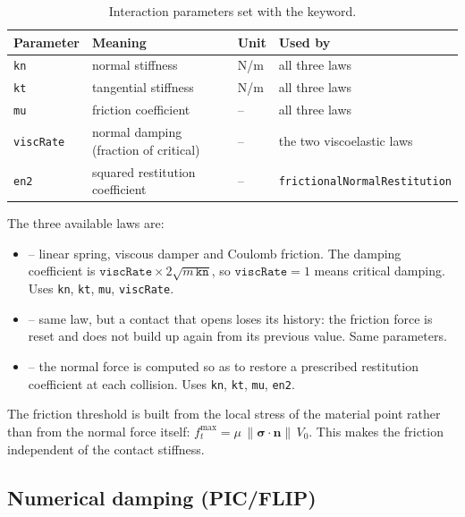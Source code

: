 \documentclass[a4paper,onecolumn,11pt]{doofus}
\begin{document}
\begin{table}[H]
\centering
\begin{tabular}{llll}
\toprule
\textbf{Parameter} & \textbf{Meaning} & \textbf{Unit} & \textbf{Used by}\\
\midrule
\texttt{kn}       & normal stiffness            & N/m & all three laws \\
\texttt{kt}       & tangential stiffness        & N/m & all three laws \\
\texttt{mu}       & friction coefficient        & --  & all three laws \\
\texttt{viscRate} & normal damping (fraction of critical) & -- & the two viscoelastic laws \\
\texttt{en2}      & squared restitution coefficient & -- & \texttt{frictionalNormalRestitution} \\
\bottomrule
\end{tabular}
\caption{Interaction parameters set with the  keyword.}
\label{tab:setparams}
\end{table}

The three available laws are:

\begin{itemize}
\item {} -- linear spring, viscous damper and Coulomb friction.
      The damping coefficient is $\texttt{viscRate} \times 2\sqrt{m\,\texttt{kn}}$, so
      $\texttt{viscRate}=1$ means critical damping. Uses \texttt{kn}, \texttt{kt}, \texttt{mu},
      \texttt{viscRate}.
\item {} -- same law, but a contact that opens loses its
      history: the friction force is reset and does not build up again from its previous value.
      Same parameters.
\item {} -- the normal force is computed so as to restore a
      prescribed restitution coefficient at each collision. Uses \texttt{kn}, \texttt{kt},
      \texttt{mu}, \texttt{en2}.
\end{itemize}

The friction threshold is built from the local stress of the material point rather than from the
normal force itself: $f_t^{\max} = \mu \, \|\bm{\sigma}\cdot\bm{n}\| \, V_0$. This makes the
friction independent of the contact stiffness.

\subsection{Numerical damping (PIC/FLIP)}
\label{sec:pic}
\end{document}
